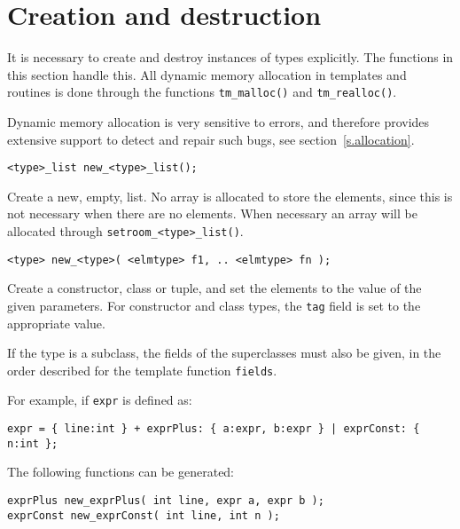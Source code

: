 \section{Creation and destruction}
It is necessary to create and destroy instances of {\Tm} types explicitly.
The functions in this section handle this.
All dynamic memory allocation in {\Tm} templates and routines is done through
the functions \verb+tm_malloc()+ and \verb+tm_realloc()+.
\par
Dynamic memory allocation is very sensitive to errors,
and therefore {\Tm} provides extensive support to detect and repair such
bugs, see section~\ref{s.allocation}.
\par
\begin{verbatim}
<type>_list new_<type>_list();
\end{verbatim}
\begin{desc}
Create a new, empty, list.
No array is allocated to store the elements,
since this is not necessary when there are no elements.
When necessary an array will be allocated through \verb+setroom_<type>_list()+.
\end{desc}
\begin{verbatim}
<type> new_<type>( <elmtype> f1, .. <elmtype> fn );
\end{verbatim}
\begin{desc}
Create a constructor, class or tuple,
and set the elements to the value of the given parameters.
For constructor and class types, the {\tt tag} field is set to the appropriate
value.
\par
If the type is a subclass, the fields of the superclasses must also
be given, in the order described for the {\Tm} template function {\tt fields}.
\par
For example, if {\tt expr} is defined as:
\begin{showfile}
\begin{verbatim}
expr = { line:int } + exprPlus: { a:expr, b:expr } | exprConst: { n:int };
\end{verbatim}
\end{showfile}
The following functions can be generated:
\begin{showfile}
\begin{verbatim}
exprPlus new_exprPlus( int line, expr a, expr b );
exprConst new_exprConst( int line, int n );
\end{verbatim}
\end{showfile}
\end{desc}
